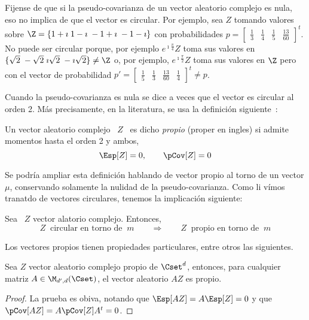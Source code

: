 Fijense de que si la pseudo-covarianza  de un vector aleatorio complejo es nula,
eso  no implica de  que el  vector es  circular.  Por  ejemplo, sea  $Z$ tomando
valores sobre  $\Z = \{ 1+\imath \;  1-\imath \; -1+\imath \;  -1-\imath \}$ con
probabilidades   $p  =   \begin{bmatrix}   \frac13  &   \frac14   &  \frac15   &
  \frac{13}{60}  \end{bmatrix}^t$. No  puede  ser circular  porque, por  ejemplo
$e^{\imath \frac{\pi}{4}} Z$ toma sus valores en $\{ \sqrt2 \; -\sqrt2 \; \imath
\sqrt2 \; -\imath \sqrt2 \} \ne \Z$ o, por ejemplo, $e^{\imath \frac{\pi}{2}} Z$
toma   sus  valores   en  $\Z$   pero  con   el  vector   de   probabilidad  $p'
= \begin{bmatrix} \frac15 & \frac13 & \frac{13}{60} & \frac14\end{bmatrix}^t \ne
p$.

Cuando la pseudo-covarianza es nula se dice a veces que el vector es circular al
orden  2.  M\'as  precisamente,  en   la  literatura,  se  usa  la  definici\'on
siguiente~\cite[Def.~17.4.1]{Lap17}:
%
\begin{definicion}\label{Def:MP:VectorAleatorioComplejoPropio}
%
  Un vector aleatorio complejo \ $Z$  \ es dicho {\em propio} (proper en ingles)
  si admite momentos hasta el orden 2 y ambos,
  \[
  \Esp[Z] = 0, \qquad \pCov[Z] = 0
  \]
\end{definicion}
%
Se podr\'ia ampliar  esta definici\'on hablando de vector propio  al torno de un
vector $\mu$, conservando solamente la nulidad de la pseudo-covarianza. Como li v\'imos tranatdo de vectores circulares, tenemos la implicaci\'on siguiente:

\begin{teorema}[Circularidad]
\label{Teo:MP:Circularidad}
%
  Sea   \   $Z$ vector alatorio complejo.  Entonces,
%
  \[
  Z \:  \mbox{ circular en torno  de } \:  m \qquad \Longrightarrow \qquad  Z \:
  \mbox{ propio en torno de } \: m
  \]
\end{teorema}
%

Los vectores propios tienen  propiedades particulares, entre otros las siguientes.

\begin{teorema}\label{Teo:MP:PropioLineal}
%
  Sea  $Z$  vector  aleatorio  complejo  propio  de  $\Cset^d$,  entonces,  para
  cualquier matriz $A \in \M_{d',d}(\Cset)$, el vector aleatorio $A Z$ es propio.
\end{teorema}
\begin{proof}
  La prueba es obiva, notando que $\Esp[A Z]  = A \Esp[Z] = 0$ y que $\pCov[A Z]
  = A \pCov[Z] A^t = 0$.
\end{proof}


